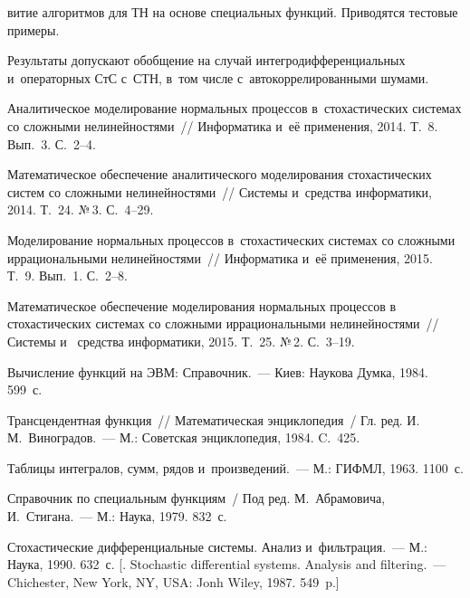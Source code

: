 \begin{multicols}{2}
 \pagebreak

 \noindent
витие алгоритмов для ТН на основе специальных функций. Приводятся тестовые примеры.

Результаты допускают обобщение на случай интегродифференциальных и~операторных СтС с~СТН,  в~том числе с~автокоррелированными шумами.


{\small\frenchspacing
 {%
 \begin{thebibliography}{99}

Аналитическое моделирование нормальных процессов в~стохастических системах со сложными нелинейностями~// Информатика и~её применения, 2014. Т.~8. Вып.~3. С.~2--4.

Математическое обеспечение аналитического моделирования стохастических систем со сложными нелинейностями~// Системы и~средства информатики, 2014. Т.~24. №\,3. С.~4--29.

Моделирование нормальных процессов в~стохастических системах со сложными иррациональными нелинейностями~// Информатика и~её применения, 2015. Т.~9. Вып.~1. С.~2--8.

Математическое обеспечение моделирования нормальных процессов
в стохастических системах со сложными иррациональными нелинейностями~// Системы и~ средства информатики, 2015.
Т.~25. №\,2. С.~3--19.

Вычисление функций на ЭВМ: Справочник.~--- Киев: Наукова Думка, 1984. 599~с.

Трансцендентная функция~// Математическая энциклопедия~/ Гл. ред. И.\,М.~Виноградов.~--- М.: Советская энциклопедия, 1984. C.~425.

Таблицы интегралов, сумм, рядов и~произведений.~--- М.: ГИФМЛ, 1963. 1100~с.

Справочник по специальным функциям~/ Под ред. М.~Абрамовича, И.~Стигана.~--- М.: Наука, 1979. 832~с.

Стохастические дифференциальные системы. Анализ и~фильтрация.~--- М.:
Наука,  1990.  632~с. [. Stochastic differential systems.
Analysis and filtering.~--- Chichester, New York, NY, USA: Jonh Wiley, 1987.
549~p.]


\end{thebibliography}}}
\end{multicols}
